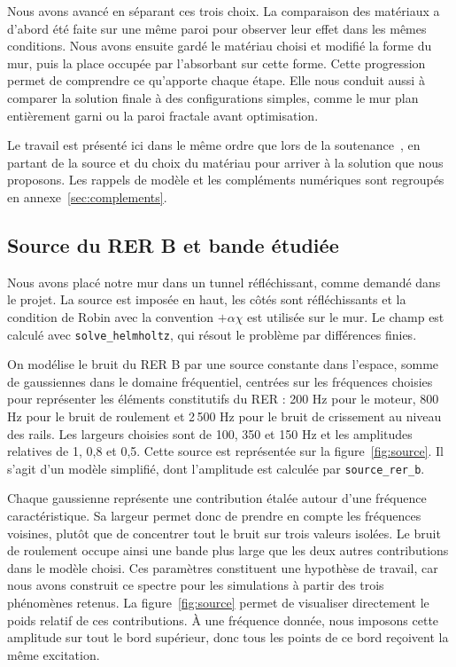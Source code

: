 \documentclass[11pt,a4paper]{article}
\newcommand{\code}[1]{\begingroup\def\UrlBreaks{\do\_\do\/\do\.}\nolinkurl{#1}\endgroup}
\begin{document}
Nous avons avancé en séparant ces trois choix. La comparaison des matériaux a d'abord été faite sur une même paroi pour observer leur effet dans les mêmes conditions. Nous avons ensuite gardé le matériau choisi et modifié la forme du mur, puis la place occupée par l'absorbant sur cette forme. Cette progression permet de comprendre ce qu'apporte chaque étape. Elle nous conduit aussi à comparer la solution finale à des configurations simples, comme le mur plan entièrement garni ou la paroi fractale avant optimisation.

Le travail est présenté ici dans le même ordre que lors de la soutenance~\cite{soutenance}, en partant de la source et du choix du matériau pour arriver à la solution que nous proposons. Les rappels de modèle et les compléments numériques sont regroupés en annexe~\ref{sec:complements}.

\subsection{Source du RER B et bande étudiée}
Nous avons placé notre mur dans un tunnel réfléchissant, comme demandé dans le projet. La source est imposée en haut, les côtés sont réfléchissants et la condition de Robin avec la convention $+\alpha\chi$ est utilisée sur le mur. Le champ est calculé avec \code{solve_helmholtz}, qui résout le problème par différences finies.

On modélise le bruit du RER B par une source constante dans l'espace, somme de gaussiennes dans le domaine fréquentiel, centrées sur les fréquences choisies pour représenter les éléments constitutifs du RER : 200 Hz pour le moteur, 800 Hz pour le bruit de roulement et 2\,500 Hz pour le bruit de crissement au niveau des rails. Les largeurs choisies sont de 100, 350 et 150 Hz et les amplitudes relatives de 1, 0,8 et 0,5. Cette source est représentée sur la figure~\ref{fig:source}. Il s'agit d'un modèle simplifié, dont l'amplitude est calculée par \code{source_rer_b}.

Chaque gaussienne représente une contribution étalée autour d'une fréquence caractéristique. Sa largeur permet donc de prendre en compte les fréquences voisines, plutôt que de concentrer tout le bruit sur trois valeurs isolées. Le bruit de roulement occupe ainsi une bande plus large que les deux autres contributions dans le modèle choisi. Ces paramètres constituent une hypothèse de travail, car nous avons construit ce spectre pour les simulations à partir des trois phénomènes retenus. La figure~\ref{fig:source} permet de visualiser directement le poids relatif de ces contributions. À une fréquence donnée, nous imposons cette amplitude sur tout le bord supérieur, donc tous les points de ce bord reçoivent la même excitation.
\end{document}
